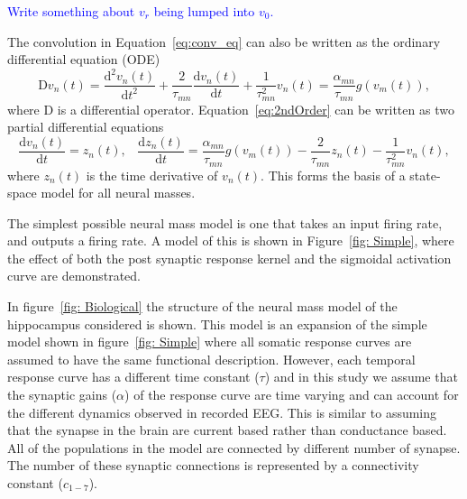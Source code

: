 \documentclass[10pt]{article}%
\newcommand{\dean}[1]{\textcolor{blue}{#1}}
\begin{document}
 \dean{Write something about $v_r$ being lumped into $v_0$.}

The convolution in Equation~\ref{eq:conv_eq} can also be written as the ordinary differential equation (ODE)
\begin{equation}\label{eq:2ndOrder}
    \mathrm{D}v_n(t) = \frac{\mathrm{d}^2 v_n(t)}{\mathrm{d}t^2} + \frac{2}{\tau_{mn}}\frac{\mathrm{d} v_n(t)}{\mathrm{d}t} + \frac{1}{\tau_{mn}^2} v_n(t) = \frac{\alpha_{mn}}{\tau_{mn}} g(v_m(t)),
\end{equation}
where $\mathrm{D}$ is a differential operator. Equation~\ref{eq:2ndOrder} can be written as two partial differential equations
\begin{equation} \label{eq:2ndOrderNMM}
    \frac{\mathrm{d} v_n(t)}{\mathrm{d}t} = z_n(t),\,\,\,\,\,    \frac{\mathrm{d}z_n(t)}{\mathrm{d}t} = \frac{\alpha_{mn}}{\tau_{mn}} g(v_m(t)) - \frac{2}{\tau_{mn}}z_n(t) - \frac{1}{\tau_{mn}^2} v_n(t),
\end{equation}
where $z_n(t)$ is the time derivative of $v_n(t)$. This forms the basis of a state-space model for all neural masses.

The simplest possible neural mass model is one that takes an input firing rate, and outputs a firing rate. A model of this is shown in Figure~\ref{fig: Simple}, where the effect of both the post synaptic response kernel and the sigmoidal activation curve are demonstrated.

In figure~\ref{fig: Biological} the structure of the neural mass model of the hippocampus considered is shown. This model is an expansion of the simple model shown in figure~\ref{fig: Simple} where all somatic response curves are assumed to have the same functional description. However, each temporal response curve has a different time constant ($\tau$) and in this study we assume that the synaptic gains ($\alpha$) of the response curve are time varying and can account for the different dynamics observed in recorded EEG. This is similar to assuming that the synapse in the brain are current based rather than conductance based. All of the populations in the model are connected by different number of synapse. The number of these synaptic connections is represented by a connectivity constant ($c_{1-7}$). 
\end{document}
